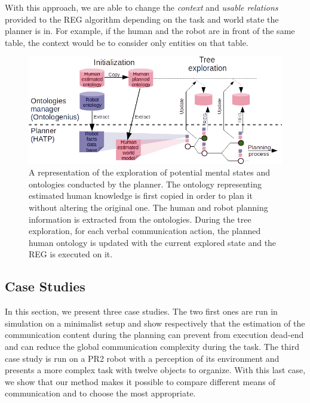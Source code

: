 \documentclass[a4paper,11pt,twoside]{StyleThese}
\begin{document}
With this approach, we are able to change the \textit{context} and \textit{usable relations} provided to the REG algorithm depending on the task and world state the planner is in. For example, if the human and the robot are in front of the same table, the context would be to consider only entities on that table.

\begin{figure}[t!]
\centering
\includegraphics[width=\textwidth]{figures/chapter3/struct.png}
\caption{\label{fig:integration} A representation of the exploration of potential mental states and ontologies conducted by the planner. The ontology representing estimated human knowledge is first copied in order to plan it without altering the original one. The human and robot planning information is extracted from the ontologies. During the tree exploration, for each verbal communication action, the planned human ontology is updated with the current explored state and the REG is executed on it.}
\end{figure}


\subsection{Case Studies}
\label{sec:Case_studies}

In this section, we present three case studies. The two first ones are run in simulation on a minimalist setup and show respectively that the estimation of the communication content during the planning can prevent from execution dead-end and can reduce the global communication complexity during the task. The third case study is run on a PR2 robot with a perception of its environment and presents a more complex task with twelve objects to organize. With this last case, we show that our method makes it possible to compare different means of communication and to choose the most appropriate.
\end{document}
